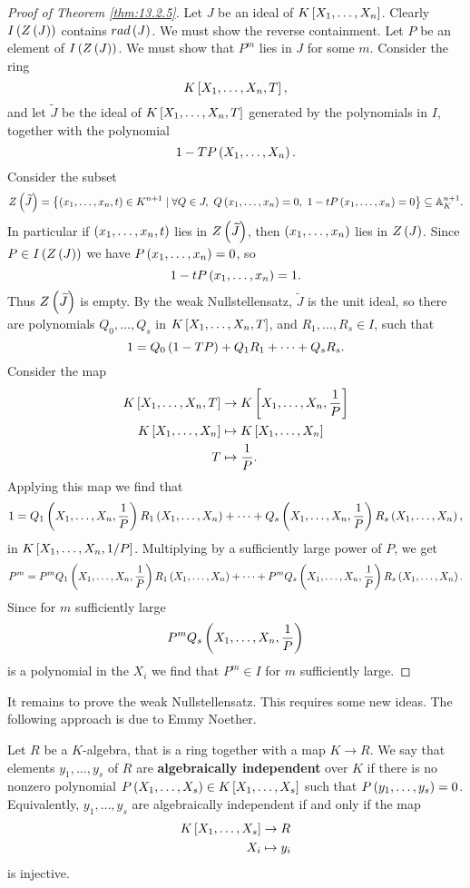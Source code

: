 \begin{proof}[Proof of Theorem \ref{thm:13.2.5}]
Let $ J $ be an ideal of $ K\sb{X_1, \dots, X_n} $. Clearly $ I\rb{Z\rb{J}} $ contains $ rad\rb{J} $. We must show the reverse containment. Let $ P $ be an element of $ I\rb{Z\rb{J}} $. We must show that $ P^m $ lies in $ J $ for some $ m $. Consider the ring
$$ K\sb{X_1, \dots, X_n, T}, $$
and let $ \widetilde{J} $ be the ideal of $ K\sb{X_1, \dots, X_n, T} $ generated by the polynomials in $ I $, together with the polynomial
$$ 1 - TP\rb{X_1, \dots, X_n}. $$
Consider the subset
$$ Z\rb{\widetilde{J}} = \cb{\rb{x_1, \dots, x_n, t} \in K^{n + 1} \mid \forall Q \in J, \ Q\rb{x_1, \dots, x_n} = 0, \ 1 - tP\rb{x_1, \dots, x_n} = 0} \subseteq \A_K^{n + 1}. $$
In particular if $ \rb{x_1, \dots, x_n, t} $ lies in $ Z\rb{\widetilde{J}} $, then $ \rb{x_1, \dots, x_n} $ lies in $ Z\rb{J} $. Since $ P \in I\rb{Z\rb{J}} $ we have $ P\rb{x_1, \dots, x_n} = 0 $, so
$$ 1 - tP\rb{x_1, \dots, x_n} = 1. $$
Thus $ Z\rb{\widetilde{J}} $ is empty. By the weak Nullstellensatz, $ \widetilde{J} $ is the unit ideal, so there are polynomials $ Q_0, \dots, Q_s $ in $ K\sb{X_1, \dots, X_n, T} $, and $ R_1, \dots, R_s \in I $, such that
$$ 1 = Q_0\rb{1 - TP} + Q_1R_1 + \dots + Q_sR_s. $$
Consider the map
\begin{align*}
K\sb{X_1, \dots, X_n, T} & \to K\sb{X_1, \dots, X_n, \dfrac{1}{P}} \\
K\sb{X_1, \dots, X_n} & \mapsto K\sb{X_1, \dots, X_n} \\
T & \mapsto \dfrac{1}{P}.
\end{align*}
Applying this map we find that
$$ 1 = Q_1\rb{X_1, \dots, X_n, \dfrac{1}{P}}R_1\rb{X_1, \dots, X_n} + \dots + Q_s\rb{X_1, \dots, X_n, \dfrac{1}{P}}R_s\rb{X_1, \dots, X_n}, $$
in $ K\sb{X_1, \dots, X_n, 1 / P} $. Multiplying by a sufficiently large power of $ P $, we get
$$ P^m = P^mQ_1\rb{X_1, \dots, X_n, \dfrac{1}{P}}R_1\rb{X_1, \dots, X_n} + \dots + P^mQ_s\rb{X_1, \dots, X_n, \dfrac{1}{P}}R_s\rb{X_1, \dots, X_n}. $$
Since for $ m $ sufficiently large
$$ P^mQ_s\rb{X_1, \dots, X_n, \dfrac{1}{P}} $$
is a polynomial in the $ X_i $ we find that $ P^m \in I $ for $ m $ sufficiently large.
\end{proof}

It remains to prove the weak Nullstellensatz. This requires some new ideas. The following approach is due to Emmy Noether.

\begin{definition}
Let $ R $ be a $ K $-algebra, that is a ring together with a map $ K \to R $. We say that elements $ y_1, \dots, y_s $ of $ R $ are \textbf{algebraically independent} over $ K $ if there is no nonzero polynomial $ P\rb{X_1, \dots, X_s} \in K\sb{X_1, \dots, X_s} $ such that $ P\rb{y_1, \dots, y_s} = 0 $. Equivalently, $ y_1, \dots, y_s $ are algebraically independent if and only if the map
\begin{align*}
K\sb{X_1, \dots, X_s} & \to R \\
X_i & \mapsto y_i
\end{align*}
is injective.
\end{definition}

